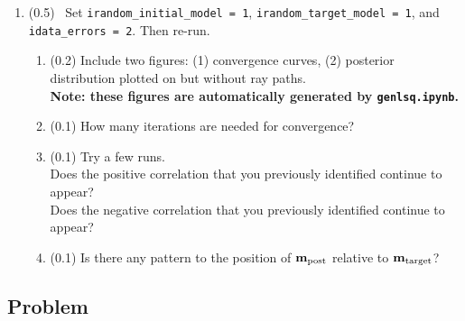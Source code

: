 \documentclass[11pt,titlepage,fleqn]{article}
\begin{document}
\begin{enumerate}

\item (0.5) \ptag\ Set \verb+irandom_initial_model = 1+, \verb+irandom_target_model = 1+, and \verb+idata_errors = 2+. Then re-run.
%
\begin{enumerate}
\item (0.2) Include two figures: (1) convergence curves, (2) posterior distribution plotted on  but without ray paths. \\
{\bf Note: these figures are automatically generated by \verb+genlsq.ipynb+.}
\item (0.1) How many iterations are needed for convergence?
\item (0.1) Try a few runs. \\
Does the positive correlation that you previously identified continue to appear? \\
Does the negative correlation that you previously identified continue to appear?
\item (0.1) Is there any pattern to the position of $\mbox{${\bf m}$}_{\rm post}$ relative to $\mbox{${\bf m}$}_{\rm target}$?
\end{enumerate}

\end{enumerate}


\pagebreak

\subsection*{Problem} \howmuchtime\




\clearpage\pagebreak
%


\end{document}
